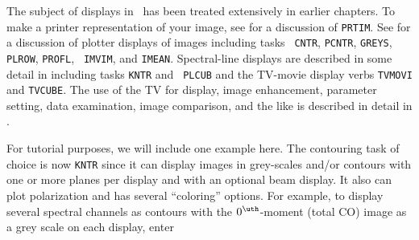 
     The subject of displays in \AIPS\ has been treated extensively in
earlier chapters.  To make a printer representation of your image, see
 for a discussion of {\tt PRTIM}\@.  See 
for a discussion of plotter displays of images including tasks {\tt
CNTR}, {\tt PCNTR}, {\tt GREYS}, {\tt PLROW}, {\tt PROFL}, {\tt
IMVIM}, and {\tt IMEAN}\@.  Spectral-line displays are described in
some detail in  including tasks {\tt KNTR} and {\tt
PLCUB} and the TV-movie display verbs {\tt TVMOVI} and {\tt TVCUBE}\@.
The use of the TV for display, image enhancement, parameter setting,
data examination, image comparison, and the like is described in
detail in .

     For tutorial purposes, we will include one example here.  The
contouring task of choice is now {\tt KNTR} since it can display
images in grey-scales and/or contours with one or more planes per
display and with an optional beam display.  It also can plot
polarization and has several ``coloring'' options.  For example, to
display several spectral channels as contours with the
$0^{\uth}$-moment (total CO) image as a grey scale on each display,
enter
